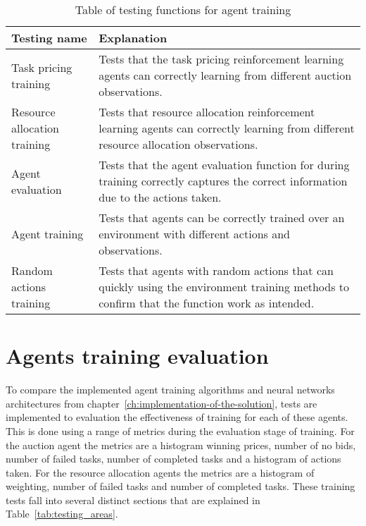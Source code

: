 \begin{table}[h]
    \centering
    \begin{tabular}{|p{3cm}|p{8cm}|} \hline
        \textbf{Testing name} & \textbf{Explanation} \\ \hline
        Task pricing training & Tests that the task pricing reinforcement learning agents can correctly learning from
            different auction observations. \\ \hline
        Resource allocation training & Tests that resource allocation reinforcement learning agents can correctly
            learning from different resource allocation observations. \\ \hline
        Agent evaluation & Tests that the agent evaluation function for during training correctly captures the correct
            information due to the actions taken. \\ \hline
        Agent training & Tests that agents can be correctly trained over an environment with different actions and
            observations. \\ \hline
        Random actions training & Tests that agents with random actions that can quickly using the environment training
            methods to confirm that the function work as intended. \\ \hline
    \end{tabular}
    \caption{Table of testing functions for agent training}
    \label{tab:training_testing}
\end{table}

\section{Agents training evaluation}\label{sec:evaluation-testing}
To compare the implemented agent training algorithms and neural networks architectures from
chapter~\ref{ch:implementation-of-the-solution}, tests are implemented to evaluation the effectiveness of training for
each of these agents. This is done using a range of metrics during the evaluation stage of training. For the
auction agent the metrics are a histogram winning prices, number of no bids, number of failed tasks, number of completed
tasks and a histogram of actions taken. For the resource allocation agents the metrics are a histogram of weighting,
number of failed tasks and number of completed tasks. These training tests fall into several distinct sections that are
explained in Table~\ref{tab:testing_areas}.

